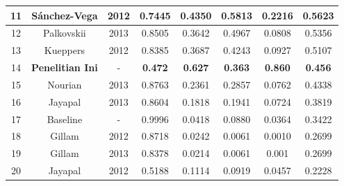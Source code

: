 \documentclass[../Book.tex]{subfiles}
\begin{document}
\begin{table}[H]
{\begin{tabular}{cccccccc}
		11 & Sánchez-Vega              & 2012         & 0.7445            & 0.4350            & 0.5813                 & 0.2216             & 0.5623            \\ \hline
		12 & Palkovskii                & 2013         & 0.8505            & 0.3642            & 0.4967                 & 0.0808             & 0.5356            \\ \hline
		13 & Kueppers                  & 2012         & 0.8385            & 0.3687            & 0.4243                 & 0.0927             & 0.5107            \\ \hline
		14 & \textbf{Penelitian Ini}  & - 			  & \textbf{0.472}		  & \textbf{0.627}	  & \textbf{0.363}		   & \textbf{0.860}     & \textbf{0.456}    \\ \hline 
		15 & Nourian                   & 2013         & 0.8763            & 0.2361            & 0.2857                 & 0.0762             & 0.4338            \\ \hline
		16 & Jayapal                   & 2013         & 0.8604            & 0.1818            & 0.1941                 & 0.0724             & 0.3819            \\ \hline
		17 & Baseline                  & -            & 0.9996            & 0.0418            & 0.0880                 & 0.0364             & 0.3422            \\ \hline
		18 & Gillam                    & 2012         & 0.8718            & 0.0242            & 0.0061                 & 0.0010             & 0.2699            \\ \hline
		19 & Gillam                    & 2013         & 0.8378            & 0.0214            & 0.0061                 & 0.001              & 0.2699            \\ \hline
		20 & Jayapal                   & 2012         & 0.5188            & 0.1114            & 0.0919                 & 0.0457             & 0.2228            \\ \hline
	\end{tabular}
	}
 
\end{table}
\end{document}
